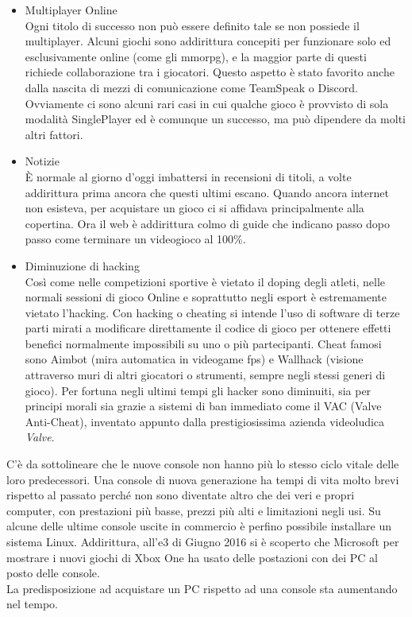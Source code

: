 \begin{itemize}
\item Multiplayer Online \\
Ogni titolo di successo non può essere definito tale se non possiede il multiplayer. Alcuni giochi sono addirittura concepiti per funzionare solo ed esclusivamente online (come gli \gls{mmorpg}), e la maggior parte di questi richiede collaborazione tra i giocatori. Questo aspetto è stato favorito anche dalla nascita di mezzi di comunicazione come TeamSpeak o Discord. Ovviamente ci sono alcuni rari casi in cui qualche gioco è provvisto di sola modalità SinglePlayer ed è comunque un successo, ma può dipendere da molti altri fattori.
\item Notizie \\
È normale al giorno d’oggi imbattersi in recensioni di titoli, a volte addirittura prima ancora che questi ultimi escano. Quando ancora internet non esisteva, per acquistare un gioco ci si affidava principalmente alla copertina. Ora il web è addirittura colmo di guide che indicano passo dopo passo come terminare un videogioco al 100\%.
\item Diminuzione di hacking \\
Così come nelle competizioni sportive è vietato il doping degli atleti, nelle normali sessioni di gioco Online e soprattutto negli \gls{esport} è estremamente vietato l’hacking.
Con hacking o cheating si intende l’uso di software di terze parti mirati a modificare direttamente il codice di gioco per ottenere effetti benefici normalmente impossibili su uno o più partecipanti. Cheat famosi sono Aimbot (mira automatica in videogame \gls{fps}) e Wallhack (visione attraverso muri di altri giocatori o strumenti, sempre negli stessi generi di gioco). Per fortuna negli ultimi tempi gli hacker sono diminuiti, sia per principi morali sia grazie a sistemi di ban immediato come il VAC (Valve Anti-Cheat), inventato appunto dalla prestigiosissima azienda videoludica \textit{Valve}.
\end{itemize}
C’è da sottolineare che le nuove console non hanno più lo stesso ciclo vitale delle loro predecessori. Una console di nuova generazione ha tempi di vita molto brevi rispetto al passato perché non  sono diventate altro che dei veri e propri computer, con prestazioni più basse, prezzi più alti e limitazioni negli usi. Su alcune delle ultime console uscite in commercio è perfino possibile installare un sistema Linux. Addirittura, all’\gls{e3} di Giugno 2016 si è scoperto che Microsoft per mostrare i nuovi giochi di Xbox One ha usato delle postazioni con dei PC al posto delle console.\\La predisposizione ad acquistare un PC rispetto ad una console sta aumentando nel tempo. 
